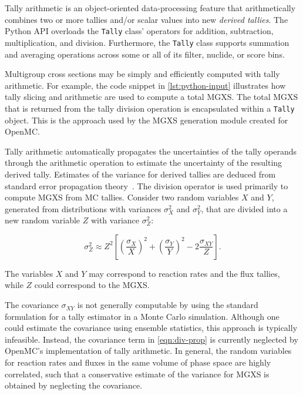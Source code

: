 Tally arithmetic is an object-oriented data-processing feature that arithmetically combines two or more tallies and/or scalar values into new \emph{derived tallies}. The Python API overloads the \texttt{Tally} class' operators for addition, subtraction, multiplication, and division. Furthermore, the \texttt{Tally} class supports summation and averaging operations across some or all of its filter, nuclide, or score bins.

Multigroup cross sections may be simply and efficiently computed with tally arithmetic. For example, the code snippet in \cref{lst:python-input} illustrates how tally slicing and arithmetic are used to compute a total MGXS. The total MGXS that is returned from the tally division operation is encapsulated within a \texttt{Tally} object. This is the approach used by the MGXS generation module created for OpenMC.



Tally arithmetic automatically propagates the uncertainties of the tally operands through the arithmetic operation to estimate the uncertainty of the resulting derived tally. Estimates of the variance for derived tallies are deduced from standard error propagation theory~\cite{bevington2003data}. The division operator is used primarily to compute MGXS from MC tallies. Consider two random variables $X$ and $Y$, generated from distributions with variances $\sigma_{X}^2$ and $\sigma_{Y}^2$, that are divided into a new random variable $Z$ with variance $\sigma_{Z}^2$:

\begin{equation}
\label{eqn:div-prop}
\sigma_{Z}^{2} \approx Z^{2}\left[\left(\frac{\sigma_{X}}{X}\right)^{2} + \left(\frac{\sigma_{Y}}{Y}\right)^{2} - 2\frac{\sigma_{XY}}{Z}\right].
\end{equation}

\noindent The variables $X$ and $Y$ may correspond to reaction rates and the flux tallies, while $Z$ could correspond to the MGXS.

The covariance $\sigma_{XY}$ is not generally computable by using the standard formulation for a tally estimator in a Monte Carlo simulation. Although one could estimate the covariance using ensemble statistics, this approach is typically infeasible. Instead, the covariance term in \cref{eqn:div-prop} is currently neglected by OpenMC's implementation of tally arithmetic. In general, the random variables for reaction rates and fluxes in the same volume of phase space are highly correlated, such that a conservative estimate of the variance for MGXS is obtained by neglecting the covariance.

